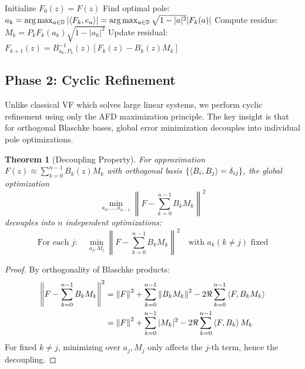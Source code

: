 \documentclass[journal]{IEEEtran}%
\newtheorem{theorem}{Theorem}
\newcommand{\inner}[2]{\braket{#1,#2}}
\begin{document}
\begin{algorithm}[H]
\caption{Initial AFD Decomposition}
\begin{algorithmic}
\State Initialize $F_0(z) = F(z)$
    \State Find optimal pole: $a_k = \arg\max_{a \in \mathbb{D}} \left|\inner{F_k}{e_a}\right| = \arg\max_{a \in \mathbb{D}} \sqrt{1-|a|^2}|F_k(a)|$
    \State Compute residue: $M_k = P_k F_k(a_k)\sqrt{1-|a_k|^2}$
    \State Update residual: $F_{k+1}(z) = B^{-1}_{a_k,P_k}(z)\left[F_k(z) - B_k(z)M_k\right]$
\EndFor
\end{algorithmic}
\end{algorithm}

\subsection{Phase 2: Cyclic Refinement}

Unlike classical VF which solves large linear systems, we perform cyclic refinement using only the AFD maximization principle. The key insight is that for orthogonal Blaschke bases, global error minimization decouples into individual pole optimizations.

\begin{theorem}[Decoupling Property]\label{thm:decoupling}
For approximation $F(z) \approx \sum_{k=0}^{n-1} B_k(z)M_k$ with orthogonal basis $\{\inner{B_i}{B_j} = \delta_{ij}\}$, the global optimization
\begin{equation}
  \min_{a_0,\ldots,a_{n-1}} \left\|F - \sum_{k=0}^{n-1} B_k M_k\right\|^2
\end{equation}
decouples into $n$ independent optimizations:
\begin{equation}
  \text{For each } j: \quad \min_{a_j, M_j} \left\|F - \sum_{k=0}^{n-1} B_k M_k\right\|^2 \quad \text{with } a_k (k \neq j) \text{ fixed}
\end{equation}
\end{theorem}

\begin{proof}
By orthogonality of Blaschke products:
\begin{align}
  \left\|F - \sum_{k=0}^{n-1} B_k M_k\right\|^2 &= \left\|F\right\|^2 + \sum_{k=0}^{n-1}\left\|B_k M_k\right\|^2 - 2\Re\sum_{k=0}^{n-1}\inner{F}{B_k M_k}\\
  &= \left\|F\right\|^2 + \sum_{k=0}^{n-1}|M_k|^2 - 2\Re\sum_{k=0}^{n-1}\inner{F}{B_k}M_k
\end{align}
For fixed $k \neq j$, minimizing over $a_j, M_j$ only affects the $j$-th term, hence the decoupling.
\end{proof}
\end{document}
